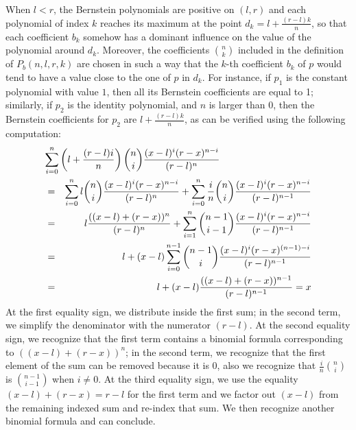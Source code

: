\documentclass{mscs}
\begin{document}
When \(l < r\), the Bernstein polynomials are positive on $(l, r)$ and
each polynomial
of index \(k\) reaches its maximum at the point \(d_k=l+\frac{(r-l)k}{n}\), so
that each coefficient \(b_k\) somehow has a dominant influence on the value
of the polynomial around \(d_k\).  Moreover, the coefficients
\(\binom{n}{k}\) included in the definition of \(P_b(n,l,r,k)\) are chosen
in such a way that the $k$-th coefficient \(b_k\) of $p$ would tend to
have a value
close to the one of $p$  in \(d_k\).  For instance, if 
\(p_1\) is the constant polynomial with value \(1\), then all its Bernstein
coefficients are equal to 1; similarly, if \(p_2\) is the identity polynomial,
and \(n\) is larger than \(0\),
then the Bernstein coefficients for \(p_2\)
are \(l + \frac{(r-l) k}{n}\), as can
be verified using the following computation:
\begin{eqnarray*}
\lefteqn{\sum_{i=0}^n \left(l + \frac{(r-l)i}{n}\right) \binom{n}{i} \frac{(x-l)^i (r-x)^{n-i}}
{(r-l)^n}}\\
&=& \sum_{i=0}^n l \binom{n}{i}\frac{(x-l)^i(r-x)^{n-i}}{(r-l)^n} +
\sum_{i=0}^n \frac{i}{n}\binom{n}{i}\frac{(x-l)^i(r-x)^{n-i}}{(r-l)^{n-1}}\\
&=& l \frac{((x -l) + (r - x))^n}{(r-l)^n} +\sum_{i=1}^n \binom{n-1}{i-1}\frac{(x-l)^i(r-x)^{n-i}}{(r-l)^{n-1}}\\
&=& l +{ (x-l)\sum_{i=0}^{n-1}\binom{n-1}{i} \frac{(x-l)^i(r-x)^{(n-1)-i}}
{(r-l)^{n-1}}}\\
&=& l + (x -l) \frac{((x-l) + (r - x))^{n-1}}{(r-l)^{n-1}} = x
\end{eqnarray*}
At the first equality sign, we distribute inside the first sum; in the
second term, we simplify the denominator with the numerator \((r-l)\).
At the second equality sign, we recognize that the first term contains
a binomial formula corresponding to \(((x-l)+(r-x))^n\); in the second
term, we recognize that the first element of the sum can be removed
because it is 0, also we recognize that \(\frac{i}{n}\binom{n}{i}\) is
\(\binom{n-1}{i-1}\) when \(i\neq 0\).  At the third equality sign,
we use the equality \((x-l)+(r-x)=r-l\) for the first term and
we factor out \((x-l)\) from the remaining indexed sum and re-index that sum.
We then recognize another binomial formula and can conclude.
\end{document}
